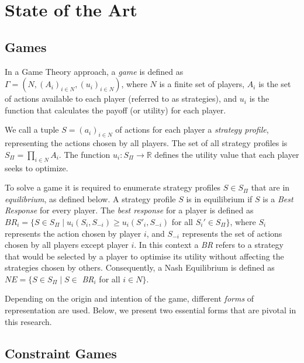 \documentclass{article}
\begin{document}

\section{State of the Art}\label{sec:stateofart}

\subsection{Games}\label{sec:games}

In a Game Theory approach, a \textit{game} is defined as $\Gamma = (N, (A_i)_{i \in N}, (u_i)_{i \in N})$, where $N$ is a finite set of players, $A_i$ is the set of actions available to each player (referred to as strategies), and $u_i$ is the function that calculates the payoff (or utility) for each player. \cite{myersonRogerB1991GTAo}

We call a tuple $S=(a_i)_{i\in N}$ of actions for each player a \textit{strategy profile}, representing the actions chosen by all players. The set of all strategy profiles is $S_\Pi=\prod_{i \in N}A_i$. The function $u_i : S_\Pi \rightarrow \mathbb{R}$ defines the utility value that each player seeks to optimize.

To solve a game it is required to enumerate strategy profiles $S \in S_\Pi$ that are in \textit{equilibrium}, as defined below.  A strategy profile $S$ is in equilibrium if $S$ is a \textit{Best Response} for every player.  The \textit{best response} for a player is defined as $\textit{BR}_i = \{ S \in S_\Pi \mid u_i(S_i,S_{-i}) \geqslant u_i(S'_i,S_{-i})$ for all  $S_i' \in S_\Pi\}$, where $S_i$ represents the action chosen by player $i$, and $S_{-i}$ represents the set of actions chosen by all players except player $i$. In this context a \textit{BR} refers to a strategy that would be selected by a player to optimise its utility without affecting the strategies chosen by others. Consequently, a Nash Equilibrium is defined as $\textit{NE} = \{ S \in S_\Pi \mid S \in$ \textit{BR}$_i$ for all $i \in N \}$.

Depending on the origin and intention of the game, different \textit{forms} of representation are used. Below, we present two essential forms that are pivotal in this research.

\subsection{Constraint Games}\label{sec:constraintgames}
\end{document}
